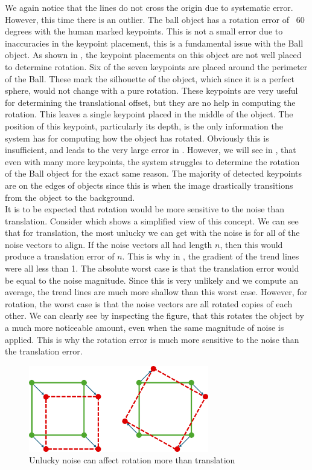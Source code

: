 We again notice that the lines do not cross the origin due to systematic error. However, this time there is an outlier. The ball object has a rotation error of ~60 degrees with the human marked keypoints. This is not a small error due to inaccuracies in the keypoint placement, this is a fundamental issue with the Ball object. As shown in , the keypoint placements on this object are not well placed to determine rotation. Six of the seven keypoints are placed around the perimeter of the Ball. These mark the silhouette of the object, which since it is a perfect sphere, would not change with a pure rotation. These keypoints are very useful for determining the translational offset, but they are no help in computing the rotation. This leaves a single keypoint placed in the middle of the object. The position of this keypoint, particularly its depth, is the only information the system has for computing how the object has rotated. Obviously this is insufficient, and leads to the very large error in . However, we will see in , that even with many more keypoints, the system struggles to determine the rotation of the Ball object for the exact same reason. The majority of detected keypoints are on the edges of objects since this is when the image drastically transitions from the object to the background.\\

It is to be expected that rotation would be more sensitive to the noise than translation. Consider  which shows a simplified view of this concept. We can see that for translation, the most unlucky we can get with the noise is for all of the noise vectors to align. If the noise vectors all had length $n$, then this would produce a translation error of $n$. This is why in , the gradient of the trend lines were all less than 1. The absolute worst case is that the translation error would be equal to the noise magnitude. Since this is very unlikely and we compute an average, the trend lines are much more shallow than this worst case. However, for rotation, the worst case is that the noise vectors are all rotated copies of each other. We can clearly see by inspecting the figure, that this rotates the object by a much more noticeable amount, even when the same magnitude of noise is applied. This is why the rotation error is much more sensitive to the noise than the translation error.

\begin{figure}[h]
    \centering
    \includegraphics[width=0.7\textwidth]{figures/noise-difference.png}
    \caption{Unlucky noise can affect rotation more than translation}
    \label{fig:noise-difference}
\end{figure}

